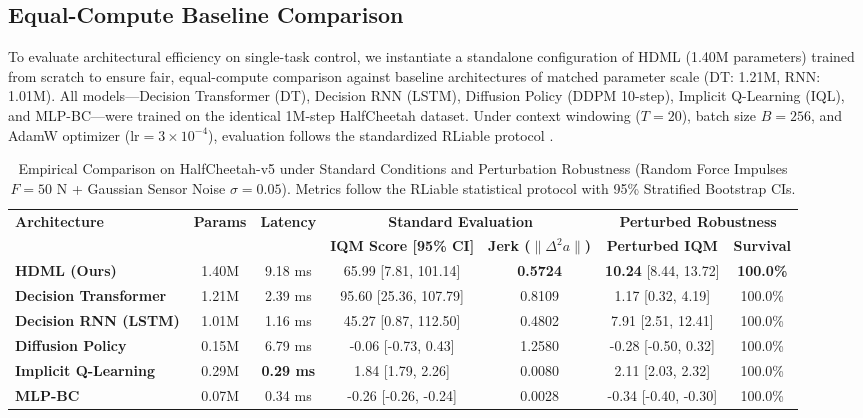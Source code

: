 \documentclass{article}
\begin{document}
\subsection{Equal-Compute Baseline Comparison}
To evaluate architectural efficiency on single-task control, we instantiate a standalone configuration of HDML (1.40M parameters) trained from scratch to ensure fair, equal-compute comparison against baseline architectures of matched parameter scale (DT: 1.21M, RNN: 1.01M). All models---Decision Transformer (DT), Decision RNN (LSTM), Diffusion Policy (DDPM 10-step), Implicit Q-Learning (IQL), and MLP-BC---were trained on the identical 1M-step HalfCheetah dataset. Under context windowing ($T=20$), batch size $B=256$, and AdamW optimizer ($\text{lr}=3\times 10^{-4}$), evaluation follows the standardized RLiable protocol \cite{agarwal2021deep}.

\begin{table}[h]
\centering
\caption{Empirical Comparison on HalfCheetah-v5 under Standard Conditions and Perturbation Robustness (Random Force Impulses $F=50\text{ N}$ + Gaussian Sensor Noise $\sigma=0.05$). Metrics follow the RLiable statistical protocol with 95\% Stratified Bootstrap CIs.}
\label{tab:baseline_comparison}
\small
\begin{tabular}{lcccccc}
\toprule
\multirow{2}{*}{\textbf{Architecture}} & \multirow{2}{*}{\textbf{Params}} & \multirow{2}{*}{\textbf{Latency}} & \multicolumn{2}{c}{\textbf{Standard Evaluation}} & \multicolumn{2}{c}{\textbf{Perturbed Robustness}} \\
\cmidrule(lr){4-5} \cmidrule(lr){6-7}
& & & \textbf{IQM Score [95\% CI]} & \textbf{Jerk ($\|\Delta^2 a\|$)} & \textbf{Perturbed IQM} & \textbf{Survival} \\
\midrule
\textbf{HDML (Ours)}            & 1.40M & 9.18 ms & 65.99 [7.81, 101.14]   & \textbf{0.5724} & \textbf{10.24} [8.44, 13.72] & \textbf{100.0\%} \\
\textbf{Decision Transformer}   & 1.21M & 2.39 ms  & 95.60 [25.36, 107.79]  & 0.8109          & 1.17 [0.32, 4.19]            & 100.0\% \\
\textbf{Decision RNN (LSTM)}    & 1.01M & 1.16 ms  & 45.27 [0.87, 112.50]   & 0.4802          & 7.91 [2.51, 12.41]           & 100.0\% \\
\textbf{Diffusion Policy}       & 0.15M & 6.79 ms  & -0.06 [-0.73, 0.43]    & 1.2580          & -0.28 [-0.50, 0.32]          & 100.0\% \\
\textbf{Implicit Q-Learning}    & 0.29M & \textbf{0.29 ms} & 1.84 [1.79, 2.26]      & 0.0080          & 2.11 [2.03, 2.32]            & 100.0\% \\
\textbf{MLP-BC}                 & 0.07M & 0.34 ms  & -0.26 [-0.26, -0.24]   & 0.0028          & -0.34 [-0.40, -0.30]         & 100.0\% \\
\bottomrule
\end{tabular}
\end{table}
\end{document}
